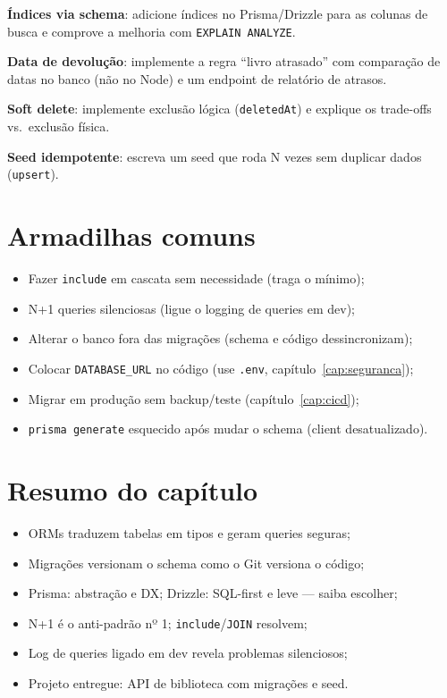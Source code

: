 \begin{seniores}
  \item \textbf{Índices via schema}: adicione índices no Prisma/Drizzle para as colunas de busca e comprove a melhoria com \texttt{EXPLAIN ANALYZE}.
  \item \textbf{Data de devolução}: implemente a regra ``livro atrasado'' com comparação de datas no banco (não no Node) e um endpoint de relatório de atrasos.
  \item \textbf{Soft delete}: implemente exclusão lógica (\texttt{deletedAt}) e explique os trade-offs vs.\ exclusão física.
  \item \textbf{Seed idempotente}: escreva um seed que roda N vezes sem duplicar dados (\texttt{upsert}).
\end{seniores}

\section{Armadilhas comuns}

\begin{itemize}[leftmargin=*, itemsep=0.4em]
  \item Fazer \texttt{include} em cascata sem necessidade (traga o mínimo);
  \item N+1 queries silenciosas (ligue o logging de queries em dev);
  \item Alterar o banco fora das migrações (schema e código dessincronizam);
  \item Colocar \texttt{DATABASE\_URL} no código (use \texttt{.env}, capítulo~\ref{cap:seguranca});
  \item Migrar em produção sem backup/teste (capítulo~\ref{cap:cicd});
  \item \texttt{prisma generate} esquecido após mudar o schema (client desatualizado).
\end{itemize}

\section{Resumo do capítulo}

\begin{itemize}[leftmargin=*, itemsep=0.3em]
  \item ORMs traduzem tabelas em tipos e geram queries seguras;
  \item Migrações versionam o schema como o Git versiona o código;
  \item Prisma: abstração e DX; Drizzle: SQL-first e leve — saiba escolher;
  \item N+1 é o anti-padrão nº 1; \texttt{include}/\texttt{JOIN} resolvem;
  \item Log de queries ligado em dev revela problemas silenciosos;
  \item Projeto entregue: API de biblioteca com migrações e seed.
\end{itemize}

